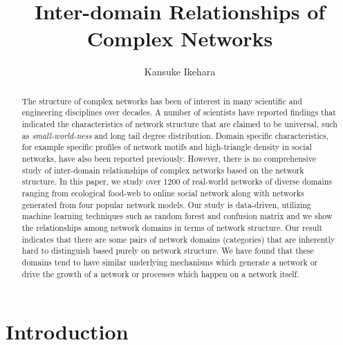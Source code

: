 \documentclass{article}
\begin{document}
\title{Inter-domain Relationships of Complex Networks}
\author{Kansuke Ikehara}
\maketitle

\begin{abstract}
The structure of complex networks has been of interest in many scientific and engineering disciplines over decades. A number of scientists have reported findings that indicated the characteristics of network structure that are claimed to be universal, such as \textit{small-world-ness} and long tail degree distribution. Domain specific characteristics, for example specific profiles of network motifs and high-triangle density in social networks, have also been reported previously. However, there is no comprehensive study of inter-domain relationships of complex networks based on the network structure. In this paper, we study over 1200 of real-world networks of diverse domains ranging from ecological food-web to online social network along with networks generated from four popular network models. Our study is data-driven, utilizing machine learning techniques such as random forest and confusion matrix and we show the relationships among network domains in terms of network structure. Our result indicates that there are some pairs of network domains (categories) that are inherently hard to distinguish based purely on network structure. We have found that these domains tend to have similar underlying mechanisms which generate a network or drive the growth of a network or processes which happen on a network itself.
  
\end{abstract}
\tableofcontents


\section{Introduction}
\end{document}
